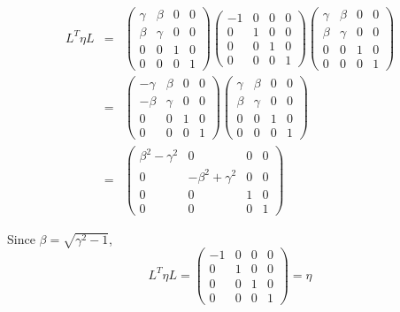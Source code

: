 \documentclass[12pt,a4paper]{article}
\begin{document}
\begin{enumerate}
\begin{eqnarray*}
L^T \eta L 
&=& 
\begin{pmatrix}
\gamma & \beta & 0 & 0 \\
\beta & \gamma & 0  & 0 \\
0 & 0 & 1 & 0 \\
0 & 0 & 0 & 1
	\end{pmatrix} 
		\begin{pmatrix}
-1 & 0 & 0 & 0 \\
0 & 1 & 0  & 0 \\
0 & 0 & 1 & 0 \\
0 & 0 & 0 & 1
	\end{pmatrix}
	\begin{pmatrix}
\gamma & \beta & 0 & 0 \\
\beta & \gamma & 0  & 0 \\
0 & 0 & 1 & 0 \\
0 & 0 & 0 & 1
	\end{pmatrix}  \\
&=&
\begin{pmatrix}
-\gamma & \beta & 0 & 0 \\
-\beta & \gamma & 0  & 0 \\
0 & 0 & 1 & 0 \\
0 & 0 & 0 & 1
	\end{pmatrix}
		\begin{pmatrix}
\gamma & \beta & 0 & 0 \\
\beta & \gamma & 0  & 0 \\
0 & 0 & 1 & 0 \\
0 & 0 & 0 & 1
	\end{pmatrix} \\
&=& 
	\begin{pmatrix}
\beta^2-\gamma^2 & 0 & 0 & 0 \\
0 & -\beta^2+\gamma^2 & 0  & 0 \\
0 & 0 & 1 & 0 \\
0 & 0 & 0 & 1
	\end{pmatrix}
\end{eqnarray*}

Since $\beta=\sqrt{\gamma^2-1}$,
\begin{equation}
L^T\eta L = 
	\begin{pmatrix}
-1 & 0 & 0 & 0 \\
0 & 1 & 0  & 0 \\
0 & 0 & 1 & 0 \\
0 & 0 & 0 & 1
	\end{pmatrix} = \eta
\end{equation}




\end{enumerate}
\end{document}
